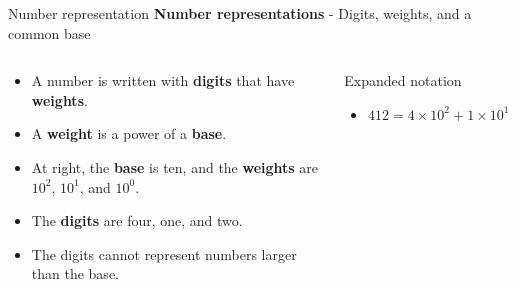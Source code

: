 \documentclass{beamer}
\begin{document}
\begin{frame}{Number representation}
\textbf{Number representations} - Digits, weights, and a common base \\ \vspace{1cm}
\begin{columns}[T]
\begin{column}{0.5\textwidth}
\centering
\begin{itemize}
\small
\item A number is written with \textbf{digits} that have \textbf{weights}.
\item A \textbf{weight} is a power of a \textbf{base}.
\item At right, the \textbf{base} is ten, and the \textbf{weights} are $10^2$, $10^1$, and $10^0$.
\item The \textbf{digits} are four, one, and two.
\item The digits cannot represent numbers larger than the base.
\end{itemize}
\end{column}
\begin{column}{0.5\textwidth}
\centering
Expanded notation \\
\hrulefill
\begin{itemize}
\item $412 = 4\times 10^2 + 1\times 10^1 + 2\times 10^0$
\end{itemize}
\end{column}
\end{columns}
\end{frame}
\end{document}

